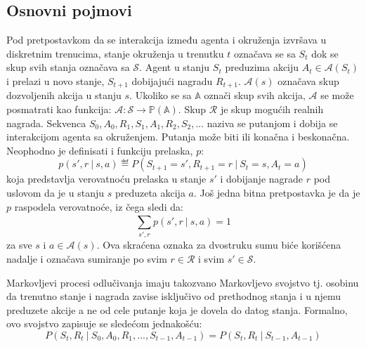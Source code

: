 \subsection{Osnovni pojmovi}
Pod pretpostavkom da se interakcija između agenta i okruženja izvršava u diskretnim trenucima, stanje okruženja u trenutku $t$ označava se sa $S_t$ dok se skup svih stanja označava sa $\mathcal{S}$.  Agent u stanju $S_t$ preduzima akciju $A_t \in \mathcal{A}(S_t)$ i prelazi u novo stanje, $S_{t+1}$ dobijajući nagradu $R_{t+1}$. $\mathcal{A}(s)$ označava skup dozvoljenih akcija u stanju $s$. Ukoliko se sa $\mathbb{A}$ označi skup svih akcija, $\mathcal{A}$ se može posmatrati kao funkcija:  $\mathcal{A}: \mathcal{S} \rightarrow  \mathbb{P}(\mathbb{A})$. Skup $\mathcal{R}$ je skup mogućih realnih nagrada. Sekvenca $S_0, A_0, R_1, S_1, A_1, R_2, S_2, ...$ naziva se putanjom i dobija se interakcijom agenta sa okruženjem. Putanja može biti ili konačna i beskonačna.
Neophodno je definisati i funkciju prelaska, $p$:
\begin{equation}
	p(s', r~|~s, a) \eqdef P(S_{t+1} = s', R_{t+1} = r ~|~ S_t = s, A_t = a)
\end{equation}
koja predstavlja verovatnoću prelaska u stanje $s'$ i dobijanje nagrade $r$ pod uslovom da je u stanju $s$ preduzeta akcija $a$. Još jedna bitna pretpostavka je da je $p$ raspodela verovatnoće, iz čega sledi da:
\begin{equation}
	\sum_{s', r}^{} p(s', r~|~s, a) = 1
\end{equation}
za sve $s$ i $a \in \mathcal{A}(s)$. Ova skraćena oznaka za dvostruku sumu biće korišćena nadalje i označava sumiranje po svim $r \in \mathcal{R}$ i svim $s' \in \mathcal{S}$.
\par 
Markovljevi procesi odlučivanja imaju takozvano Markovljevo svojstvo tj. osobinu da trenutno stanje i nagrada zavise isključivo od prethodnog stanja i u njemu preduzete akcije a ne od cele putanje koja je dovela do datog stanja. Formalno, ovo svojstvo zapisuje se sledećom jednakošću:
\begin{equation}
	P(S_t, R_t ~|~ S_0, A_0, R_1, ..., S_{t-1}, A_{t-1}) = P(S_t, R_t ~|~ S_{t-1}, A_{t-1})
\end{equation}

